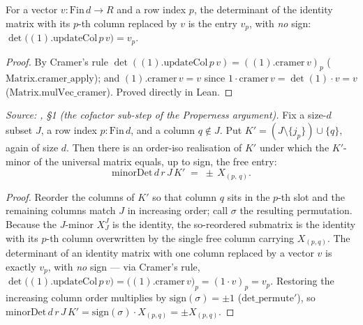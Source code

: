 \begin{lemma}\leanok
  \label{lem:gr_det_one_updateCol}
  For a vector \(v : \mathrm{Fin}\,d \to R\) and a row index \(p\), the determinant of the identity
  matrix with its \(p\)-th column replaced by \(v\) is the entry \(v_p\), with \emph{no} sign:
  \(\det\bigl((1).\mathrm{updateCol}\,p\,v\bigr) = v_p\).
\end{lemma}
\begin{proof}

\leanok
  By Cramer's rule \(\det((1).\mathrm{updateCol}\,p\,v) = ((1).\mathrm{cramer}\,v)_p\)
  (\(\mathrm{Matrix.cramer\_apply}\)); and \((1).\mathrm{cramer}\,v = v\) since
  \(\mathrm{1}\cdot\mathrm{cramer}\,v = \det(1)\cdot v = v\) (\(\mathrm{Matrix.mulVec\_cramer}\)).
  Proved directly in Lean.
\end{proof}

\begin{lemma}\leanok
  \label{lem:gr_free_entry_eq_signed_minor}
  \textit{Source: \cite{nitsure-hilbert-quot}, \S 1 (the cofactor sub-step of the Properness argument).}
  Fix a size-\(d\) subset \(J\), a row index \(p : \mathrm{Fin}\,d\), and a column \(q \notin J\). Put
  \(K' = (J \setminus \{j_p\}) \cup \{q\}\), again of size \(d\). Then there is an order-iso realisation of
  \(K'\) under which the \(K'\)-minor of the universal matrix equals, up to sign, the free entry:
  \[
    \mathrm{minorDet}\,d\,r\,J\,K' \;=\; \pm\, X_{(p,\,q)} .
  \]
\end{lemma}
\begin{proof}
  \leanok
  Reorder the columns of \(K'\) so that column \(q\) sits in the \(p\)-th slot and the remaining columns
  match \(J\) in increasing order; call \(\sigma\) the resulting permutation. Because the \(J\)-minor
  \(X^J_J\) is the identity, the so-reordered submatrix is the identity with its \(p\)-th column overwritten
  by the single free column carrying \(X_{(p,q)}\). The determinant of an identity matrix with one column
  replaced by a vector \(v\) is exactly \(v_p\), with \emph{no} sign --- via Cramer's rule,
  \(\det\bigl((1).\mathrm{updateCol}\,p\,v\bigr) = \bigl((1).\mathrm{cramer}\,v\bigr)_p
  = (\mathrm{1}\cdot v)_p = v_p\). Restoring the increasing column order multiplies by \(\mathrm{sign}(\sigma)
  = \pm 1\) (\(\mathrm{det\_permute}'\)), so \(\mathrm{minorDet}\,d\,r\,J\,K' = \mathrm{sign}(\sigma)\cdot
  X_{(p,q)} = \pm X_{(p,q)}\).
\end{proof}

